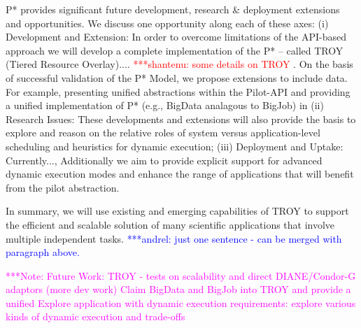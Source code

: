\documentclass[conference,final]{IEEEtran}
\newcommand{\jhanote}[1]{ {\textcolor{red} { ***shantenu: #1 }}}
\newcommand{\alnote}[1]{ {\textcolor{blue} { ***andrel: #1 }}}
\newcommand{\msnote}[1]{ {\textcolor{cyan} { ***mark: #1 }}}
\newcommand{\note}[1]{ {\textcolor{magenta} { ***Note: #1 }}}
\newcommand{\alnote}[1]{}
\newcommand{\jhanote}[1]{}
\newcommand{\msnote}[1]{}
\newcommand{\note}[1]{}
\begin{document}


P* provides significant future development, research \& deployment
extensions and opportunities. We discuss one opportunity along each of
these axes: (i) Development and Extension: In order to overcome
limitations of the API-based approach we will develop a complete
implementation of the P* -- called TROY (Tiered Resource Overlay)....
\jhanote{some details on TROY}. On the basis of successful validation
of the P* Model, we propose extensions to include data.  For example,
presenting unified abstractions within the Pilot-API and providing a
unified implementation of P* (e.g., BigData analagous to BigJob) in
(ii) Research Issues: These developments and extensions will also
provide the basis to explore and reason on the relative roles of
system versus application-level scheduling and heuristics for dynamic
execution; (iii) Deployment and Uptake: 
Currently..., %
Additionally we aim to provide explicit support for advanced
dynamic execution modes and enhance the range of applications that
will benefit from the pilot abstraction. 



In summary, we will use existing and emerging capabilities of TROY to
support the efficient and scalable solution of many scientific
applications that involve multiple independent tasks.\alnote{just one sentence - can be merged with paragraph above.}


\note{Future Work: TROY - tests on scalability and direct
  DIANE/Condor-G adaptors (more dev work) Claim BigData and BigJob
  into TROY and provide a unified Explore application with dynamic
  execution requirements: explore various kinds of dynamic execution
  and trade-offs }

\end{document}
